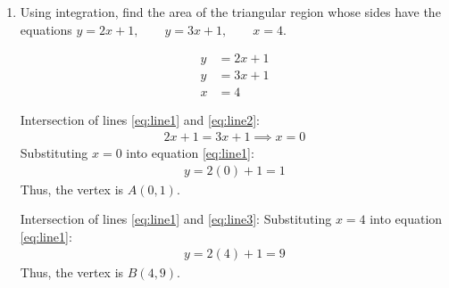 \begin{enumerate}[label=\thesubsection.\arabic*, ref=\thesubsection.\theenumi]
Substituting $nh = 2$:
\begin{align*}
	h S_n &= 3(2) + 2(2 + h) + \frac{2(2 + h)(4 + h)}{6} + e^2(e^4 - 1) \cdot e^{2h} \left(\frac{h}{e^{2h} - 1}\right) \\
	&= 6 + 2(2 + h) + \frac{(2 + h)(4 + h)}{3} + (e^6 - e^2) \cdot e^{2h} \left(\frac{1}{2} \cdot \frac{2h}{e^{2h} - 1}\right)
\end{align*}

Taking the limit as $n \to \infty$ ($h \to 0$):

Using the standard limit $\displaystyle\lim_{t \to 0} \frac{e^t - 1}{t} = 1 \implies \lim_{h \to 0} \frac{2h}{e^{2h} - 1} = 1$:
\begin{align*}
	\int_1^3 (x^2 + 2 + e^{2x})\,dx &= \lim_{h \to 0} (h S_n) \\
	&= 6 + 2(2 + 0) + \frac{(2 + 0)(4 + 0)}{3} + (e^6 - e^2) \cdot e^0 \left(\frac{1}{2} \cdot 1\right) \\
	&= 6 + 4 + \frac{8}{3} + \frac{e^6 - e^2}{2} 
	= \frac{38}{3} + \frac{e^6 - e^2}{2}
\end{align*}

Therefore:
\begin{align*}
	\int_1^3 (x^2+2+e^{2x})\,dx = \frac{38}{3} + \frac{e^6 - e^2}{2}
\end{align*}


\item Using integration, find the area of the triangular region whose sides have the equations $y=2x+1,\qquad y=3x+1,\qquad x=4$.

\solution
\begin{align}
	y &= 2x + 1 \label{eq:line1} \\
	y &= 3x + 1 \label{eq:line2} \\
	x &= 4 \label{eq:line3}
\end{align}

Intersection of lines \eqref{eq:line1} and \eqref{eq:line2}:
\begin{align*}
	2x + 1 = 3x + 1 \implies x = 0
\end{align*}
Substituting $x = 0$ into equation \eqref{eq:line1}:
\begin{align*}
	y = 2(0) + 1 = 1
\end{align*}
Thus, the vertex is $A(0, 1)$.

Intersection of lines \eqref{eq:line1} and \eqref{eq:line3}:
Substituting $x = 4$ into equation \eqref{eq:line1}:
\begin{align*}
	y = 2(4) + 1 = 9
\end{align*}
Thus, the vertex is $B(4, 9)$.


\end{enumerate}
